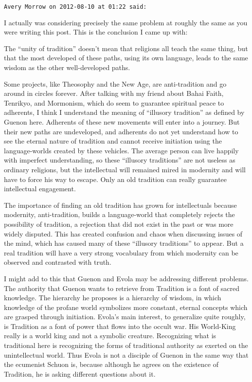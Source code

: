 \begin{footnotesize}
\begin{sffamily}
\texttt{Avery Morrow on 2012-08-10 at 01:22 said:}

I actually was considering precisely the same problem at roughly the same as you were writing this post. This is the conclusion I came up with:

\begin{quotex}\footnotesize

The ``unity of tradition'' doesn't mean that religions all teach the same thing, but that the most developed of these paths, using its own language, leads to the same wisdom as the other well-developed paths.

Some projects, like Theosophy and the New Age, are anti-tradition and go around in circles forever. After talking with my friend about Bahai Faith, Tenrikyo, and Mormonism, which do seem to guarantee spiritual peace to adherents, I think I understand the meaning of ``illusory tradition'' as defined by Guenon here. Adherents of these new movements will enter into a journey. But their new paths are undeveloped, and adherents do not yet understand how to see the eternal nature of tradition and cannot receive initiation using the language-worlds created by these vehicles. The average person can live happily with imperfect understanding, so these ``illusory traditions'' are not useless as ordinary religions, but the intellectual will remained mired in modernity and will have to force his way to escape. Only an old tradition can really guarantee intellectual engagement.

The importance of finding an old tradition has grown for intellectuals because modernity, anti-tradition, builds a language-world that completely rejects the possibility of tradition, a rejection that did not exist in the past or was more widely disputed. This has created confusion and chaos when discussing issues of the mind, which has caused many of these ``illusory traditions'' to appear. But a real tradition will have a very strong vocabulary from which modernity can be observed and contrasted with truth.
\end{quotex}


I might add to this that Guenon and Evola may be addressing different problems. The authority that Guenon wants to retrieve from Tradition is a font of sacred knowledge. The hierarchy he proposes is a hierarchy of wisdom, in which knowledge of the profane world symbolizes more constant, eternal concepts which are grasped through initiation. Evola's main interest, to generalize quite roughly, is Tradition as a font of power that flows into the occult war. His World-King really is a world king and not a symbolic creature. Recognizing what is traditional here is recognizing the forms of traditional authority as exerted on the unintellectual world. Thus Evola is not a disciple of Guenon in the same way that the ecumenist Schuon is, because although he agrees on the existence of Tradition, he is asking different questions about it.


\end{sffamily}
\end{footnotesize}

